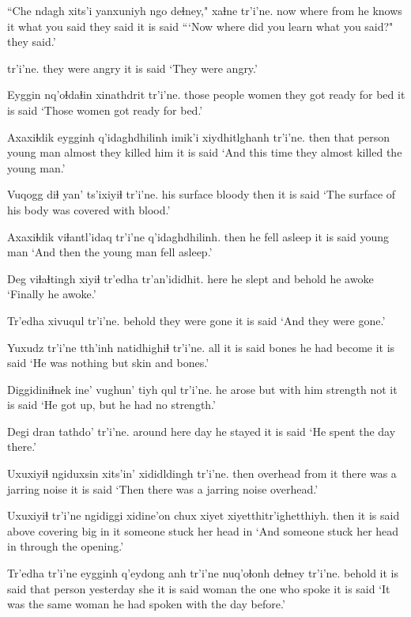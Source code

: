 \documentclass[12pt]{article}
\begin{document}
\gll ``Che ndagh xits'i yanxuniyh  ngo deɬney," xaɬne  tr'i'ne.
now where  from {he knows it} {} {what you said} {they said} {it is said}
\glt ```Now where did you learn what you said?" they said.'
\glend

 tr'i'ne. 
{they were angry}  {it is said} 
\glt `They were angry.'
\glend

\gll Eyggin nq'oɬdaɬin xinathdrit  tr'i'ne.
{those people} women  {they got ready for bed} {it is said}
\glt `Those women got ready for bed.'
\glend

\gll Axaxiɬdik eygginh q'idaghdhilinh imik'i xiydhitlghanh tr'i'ne.
then  {that person} {young man} almost {they killed him} {it is said}
\glt `And this time they almost killed the young man.'
\glend

\gll Vuqogg {diɬ yan'} ts'ixiyiɬ tr'i'ne.
{his surface} bloody then {it is said}
\glt `The surface of his body was covered with blood.'
\glend

\gll Axaxiɬdik viɬantl'idaq tr'i'ne q'idaghdhilinh.
then  {he fell asleep} {it is said} {young man}
\glt `And then the young man fell asleep.'
\glend

\gll Deg viɬaɬtingh xiyiɬ tr'edha tr'an'ididhit.
here {he slept} and behold  {he awoke}
\glt `Finally he awoke.'
\glend

\gll Tr'edha xivuqul  tr'i'ne.
behold  {they were gone} {it is said}
\glt `And they were gone.'
\glend

\gll Yuxudz tr'i'ne tth'inh natidhighiɬ  tr'i'ne.
all  {it is said} bones  {he had become}  {it is said}
\glt `He was nothing but skin and bones.'
\glend

\gll Diggidiniɬnek ine' vughun' tiyh  qul tr'i'ne.
{he arose}  but {with him} strength not {it is said}
\glt `He got up, but he had no strength.'
\glend

\gll Degi dran tathdo' tr'i'ne.
{around here} day {he stayed} {it is said}
\glt `He spent the day there.'
\glend

\gll Uxuxiyiɬ ngiduxsin xits'in' xididldingh tr'i'ne.
then  overhead {from it} {there was a jarring noise} {it is said}
\glt `Then there was a jarring noise overhead.'
\glend

\gll Uxuxiyiɬ tr'i'ne ngidiggi xidine'on chux xiyet xiyetthitr'ighetthiyh.
then  {it is said} above  covering big {in it} {someone stuck her head in}
\glt `And someone stuck her head in through the opening.'
\glend

\gll Tr'edha tr'i'ne eygginh q'eydong anh tr'i'ne nuq'oɬonh deɬney tr'i'ne.
behold  {it is said} {that person} yesterday she {it is said} woman {the one who spoke} {it is said}
\glt `It was the same woman he had spoken with the day before.'
\glend
\end{document}
